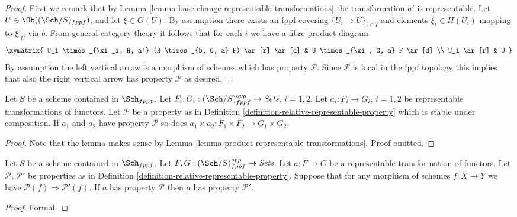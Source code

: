 \begin{proof}
First we remark that by
Lemma \ref{lemma-base-change-representable-transformations}
the transformation $a'$ is representable.
Let $U \in \Ob((\Sch/S)_{fppf})$, and let
$\xi \in G(U)$. By assumption there exists an fppf covering
$\{U_i \to U\}_{i \in I}$ and elements $\xi_i \in H(U_i)$ mapping
to $\xi|_U$ via $b$. From general category theory it follows that for
each $i$ we have a fibre product diagram
$$
\xymatrix{
U_i \times_{\xi_i, H, a'} (H \times_{b, G, a} F) \ar[r] \ar[d] &
U \times_{\xi, G, a} F \ar[d] \\
U_i \ar[r] & U
}
$$
By assumption the left vertical arrow is a morphism of schemes which
has property $\mathcal{P}$. Since $\mathcal{P}$ is local in the fppf
topology this implies that also the right vertical arrow has property
$\mathcal{P}$ as desired.
\end{proof}

\begin{lemma}
\label{lemma-product-representable-transformations-property}
Let $S$ be a scheme contained in $\Sch_{fppf}$.
Let $F_i, G_i : (\Sch/S)_{fppf}^{opp} \to \textit{Sets}$,
$i = 1, 2$.
Let $a_i : F_i \to G_i$, $i = 1, 2$ be representable transformations
of functors.
Let $\mathcal{P}$ be a property as in
Definition \ref{definition-relative-representable-property}
which is stable under composition.
If $a_1$ and $a_2$ have property $\mathcal{P}$ so does
$a_1 \times a_2 : F_1 \times F_2 \longrightarrow G_1 \times G_2$.
\end{lemma}

\begin{proof}
Note that the lemma makes sense by
Lemma \ref{lemma-product-representable-transformations}.
Proof omitted.
\end{proof}

\begin{lemma}
\label{lemma-representable-transformations-property-implication}
Let $S$ be a scheme contained in $\Sch_{fppf}$.
Let $F, G : (\Sch/S)_{fppf}^{opp} \to \textit{Sets}$.
Let $a : F \to G$ be a representable transformation of functors.
Let $\mathcal{P}$, $\mathcal{P}'$ be properties as in
Definition \ref{definition-relative-representable-property}.
Suppose that for any morphism of schemes $f : X \to Y$
we have $\mathcal{P}(f) \Rightarrow \mathcal{P}'(f)$.
If $a$ has property $\mathcal{P}$ then
$a$ has property $\mathcal{P}'$.
\end{lemma}

\begin{proof}
Formal.
\end{proof}

